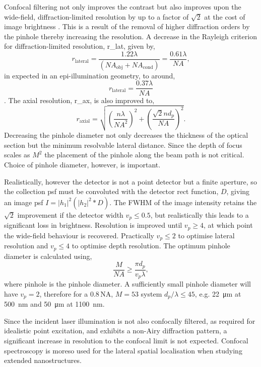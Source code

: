 \documentclass{article}
\begin{document}
Confocal filtering not only improves the contrast but also improves upon the wide-field, diffraction-limited resolution by up to a factor of $\sqrt{2}$ at the cost of image brightness \cite{}. This is a result of the removal of higher diffraction orders by the pinhole thereby increasing the resolution. A decrease in the Rayleigh criterion \cite{} for diffraction-limited resolution, \gls{r_lat}, given by,
\begin{equation}
r_{\mathrm{lateral}}=\frac{1.22\lambda}{(\mathit{NA}_{\mathrm{obj}}+\mathit{NA}_{\mathrm{cond}})}=\frac{0.61\lambda}{\mathit{NA}},
\end{equation}
in expected in an epi-illumination geometry, to around,
\begin{equation} r_{\mathrm{lateral}}=\frac{0.37\lambda}{\mathit{NA}} \end{equation} \cite{}. The axial resolution, \gls{r_ax}, is also improved to,
\begin{equation} r_{\mathrm{axial}} = \sqrt{\left(\frac{n\lambda}{\mathit{NA}^2}\right)^2 + \left(\frac{\sqrt{2}nd_{p}}{\mathit{NA}}\right)^2}.\end{equation}
Decreasing the pinhole diameter not only decreases the thickness of the optical section but the minimum resolvable lateral distance. Since the depth of focus scales as $M^2$ the placement of the pinhole along the beam path is not critical. Choice of pinhole diameter, however, is important.

Realistically, however the detector is not a point detector but a finite aperture, so the collection \gls{psf} must be convoluted with the detector rect function, $D$, giving an image \gls{psf} $I=|h_1|^2(|h_2|^2\ast D)$. The FWHM of the image intensity retains the $\sqrt{2}$ improvement if the detector width $v_p\leq0.5$, but realistically this leads to a significant loss in brightness. Resolution is improved until $v_p\geq4$, at which point the wide-field behaviour is recovered. Practically $v_p\leq2$ to optimise lateral resolution and $v_p\leq4$ to optimise depth resolution. The optimum pinhole diameter is calculated using,
\begin{equation} \frac{M}{\mathit{NA}}\geq\frac{\pi d_p}{v_p\lambda}, \end{equation}
where \gls{pinhole} is the pinhole diameter. A sufficiently small pinhole diameter will have $v_p=2$, therefore for a 0.8\,NA, $M=53$ system $d_p/\lambda\leq45$, e.g. \SI{22}{\micro\metre} at \SI{500}{nm} and \SI{50}{\micro\metre} at \SI{1100}{nm}.

Since the incident laser illumination is not also confocally filtered, as required for idealistic point excitation, and exhibits a non-Airy diffraction pattern, a significant increase in resolution to the confocal limit is not expected. Confocal spectroscopy is moreso used for the lateral spatial localisation when studying extended nanostructures.
\end{document}
